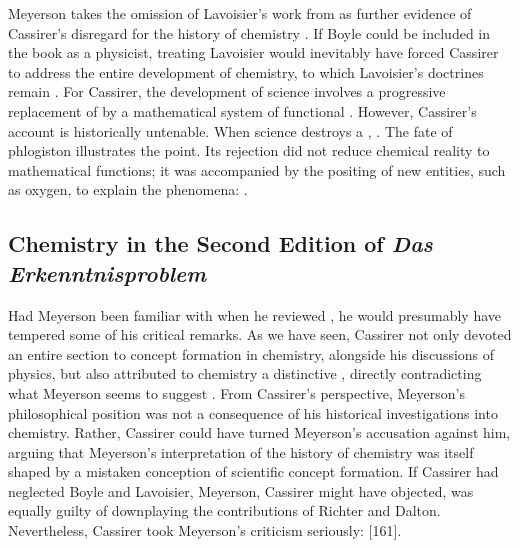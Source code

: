 \documentclass[submitted,12pt]{article}
\renewcommand{\SF}[2]{\citep[#1/#2]{Cassirer1910}}
\begin{document}
Meyerson takes the omission of Lavoisier's work from \EPt as further evidence of Cassirer's disregard for the history of chemistry \citep[103]{Meyerson1911}.  If Boyle could be included in the book as a physicist, treating Lavoisier would inevitably have forced Cassirer to address the entire development of chemistry, to which Lavoisier's doctrines remain  \citep[103]{Meyerson1911}. For Cassirer, the development of science involves a progressive replacement of  by a mathematical system of functional . However, Cassirer's account is historically untenable. When science destroys a ,   \citep[129]{Meyerson1911}.  The fate of phlogiston illustrates the point. Its rejection did not reduce chemical reality to mathematical functions; it was accompanied by the positing of new entities, such as oxygen, to explain the phenomena:  \citep[129]{Meyerson1911}. 

\subsection{Chemistry in the Second Edition of \emph{Das Erkenntnisproblem}}
%
Had Meyerson been familiar with \SFt when he reviewed \EPt, he would presumably have tempered some of his critical remarks. As we have seen, Cassirer not only devoted an entire section to concept formation in chemistry, alongside his discussions of physics, but also attributed to chemistry a distinctive , directly contradicting what Meyerson seems to suggest \SF{292}{220}. From Cassirer's perspective, Meyerson's philosophical position was not a consequence of his historical investigations into chemistry. Rather, Cassirer could have turned Meyerson's accusation against him, arguing that Meyerson's interpretation of the history of chemistry was itself shaped by a mistaken conception of scientific concept formation. If Cassirer had neglected Boyle and Lavoisier, Meyerson, Cassirer might have objected, was equally guilty of downplaying the contributions of Richter and Dalton. Nevertheless, Cassirer took Meyerson's criticism seriously:  [161].
\end{document}
